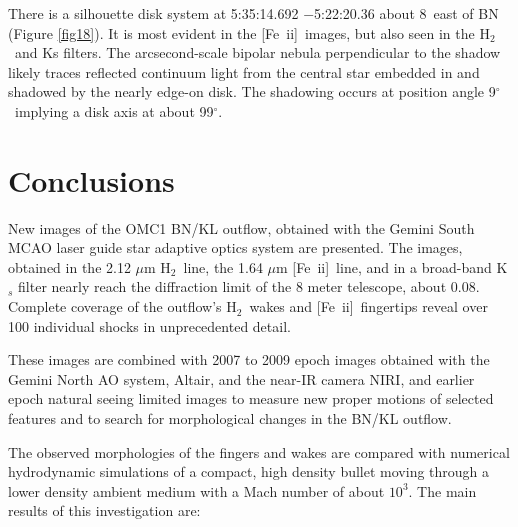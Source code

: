 \documentclass{aa}
\newcommand\arcdeg{\mbox{$^\circ$}\xspace}  %
\newcommand{\Feii}{[Fe~{\sc ii}]}
\newcommand{\hh}{\ensuremath{\textrm{H}_{2}}}			%
\begin{document}
There is a silhouette disk system at 5:35:14.692 $-$5:22:20.36 about 8\arcsec\  
east of  BN (Figure \ref{fig18}).  It is most evident  in the \Feii\  images, but also 
seen  in the \hh\  and Ks filters.   The arcsecond-scale bipolar nebula perpendicular 
to the shadow  likely traces reflected continuum light from the central star
embedded in and shadowed by the nearly  edge-on disk.    The shadowing 
occurs at position angle 9\arcdeg\ implying a disk axis at about 99\arcdeg .    

\section{Conclusions}

New images of the OMC1 BN/KL outflow, obtained with the Gemini South 
MCAO laser guide star adaptive optics system are presented.   The images,
obtained in the 2.12 $\mu$m \hh\ line, the 1.64 $\mu$m \Feii\ line, and in a
broad-band K$_s$ filter nearly reach the diffraction limit of the 8 meter telescope,
about 0.08\arcsec.     Complete coverage of the outflow's \hh\ wakes and \Feii\ 
fingertips reveal over 100 individual shocks in unprecedented detail.  

These images are combined with 2007 to 2009 epoch images obtained with the
Gemini North AO system, Altair, and the near-IR camera NIRI, and earlier epoch
natural seeing limited images to measure new proper motions of selected 
features and to search for morphological changes in the BN/KL outflow.

The observed morphologies of the fingers and wakes are compared with 
numerical hydrodynamic simulations of a compact, high density bullet moving through
a lower density ambient medium with a Mach number of about $10^3$.    The 
main results of this investigation are:
\end{document}
